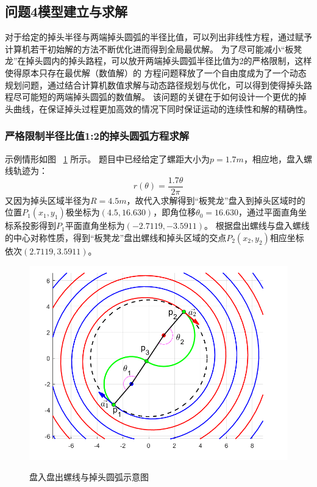\documentclass{cumcmthesis1}
\begin{document}
\par


\subsection{\textbf{问题4}模型建立与求解}
\par
对于给定的掉头半径与两端掉头圆弧的半径比值，可以列出非线性方程，通过赋予计算机若干初始解的方法不断优化进而得到全局最优解。
为了尽可能减小“板凳龙”在掉头圆内的掉头路程，可以放开两端掉头圆弧半径比值为2的严格限制，这样使得原本只存在最优解（数值解）的
方程问题释放了一个自由度成为了一个动态规划问题，通过结合计算机数值求解与动态路径规划与优化，可以得到使得掉头路程尽可能短的两端掉头圆弧的数值解。
该问题的关键在于如何设计一个更优的掉头曲线，在保证掉头过程更加高效的情况下同时保证运动的连续性和解的精确性。
\subsubsection{严格限制半径比值1:2的掉头圆弧方程求解}
示例情形如图
~\ref{fig:spiral_and_arc} 
所示。
题目中已经给定了螺距大小为$p=1.7m$，相应地，盘入螺线轨迹为：
\begin{equation}
    r(\theta)=\frac{1.7 \theta}{2 \pi}
\end{equation}
又因为掉头区域半径为$R=4.5m$，故代入求解得到“板凳龙”盘入到掉头区域时的位置$P_1(x_1,y_1)$极坐标为$(4.5,16.630)$，即角位移$\theta_0=16.630$，通过平面直角坐标系投影得到$P_1$平面直角坐标为$(-2.7119,-3.5911)$。
根据盘出螺线与盘入螺线的中心对称性质，得到“板凳龙”盘出螺线和掉头区域的交点$P_2(x_2,y_2)$相应坐标依次$(2.7119,3.5911)$。
\begin{figure}
    \caption{盘入盘出螺线与掉头圆弧示意图}
    \centering    
    \includegraphics[width=0.7\linewidth]{drawing_5.4.1.1.png}
    \label{fig:spiral_and_arc} %
\end{figure}
\par
\end{document}
